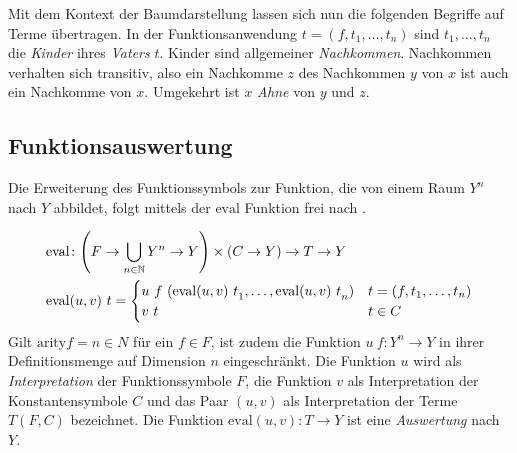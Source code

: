 \documentclass{scrartcl}
\numberwithin{figure}{section} %
\DeclarePairedDelimiter\paren{(}{)}
\theoremstyle{definition} %
\newcommand{\elems}[3]{{#1}_{#2}, \dots, {#1}_{#3}}
\newcommand{\tOneN}{\elems t 1 n}
\begin{document}
Mit dem Kontext der Baumdarstellung lassen sich nun die folgenden Begriffe auf Terme übertragen. In der Funktionsanwendung $t = (f, \tOneN)$ sind $\tOneN$ die \emph{Kinder} ihres \emph{Vaters} $t$. Kinder sind allgemeiner \emph{Nachkommen}. Nachkommen verhalten sich transitiv, also ein Nachkomme $z$ des Nachkommen $y$ von $x$ ist auch ein Nachkomme von $x$. Umgekehrt ist $x$ \emph{Ahne} von $y$ und $z$. \\


\subsection{Funktionsauswertung}
Die Erweiterung des Funktionssymbols zur Funktion, die von einem Raum $Y^n$ nach $Y$ abbildet, folgt mittels der $\mathrm{eval}$ Funktion frei nach \cite{buch1977}.

\begin{equation*}
    \begin{split}
	\mathrm{eval} &\colon \paren*{F \rightarrow \bigcup_{n \in \mathbb{N}} Y^n \rightarrow Y} \times (C \rightarrow Y) \rightarrow T \rightarrow Y\\
	\mathrm{eval} &(u, v)~t = \begin{cases}
		u~f~(\elems {\mathrm{eval}(u, v)~t} 1 n) & t = (f, \tOneN)\\
		v~t                                      & t \in C\\
		\end{cases}
    \end{split}
\end{equation*}
Gilt $\mathrm{arity} f = n \in N$ für ein $f \in F$, ist zudem die Funktion $u~f \colon Y^n \rightarrow Y$ in ihrer Definitionsmenge auf Dimension $n$ eingeschränkt. 
Die Funktion $u$ wird als \emph{Interpretation} der Funktionssymbole $F$, die Funktion $v$ als Interpretation der Konstantensymbole $C$ und das Paar $(u, v)$ als Interpretation der Terme $T(F, C)$ bezeichnet. Die Funktion $\mathrm{eval}(u, v) \colon T \rightarrow Y$ ist eine \emph{Auswertung} nach $Y$. 
\\~\\
\end{document}
